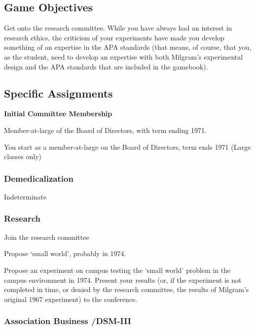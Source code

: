 \begin{refsection}
\section{Game Objectives}
\label{gameobjectives}

Get onto the research committee. While you have always had an interest in research ethics, the criticism of your experiments have made you develop something of an expertise in the APA standards (that means, of course, that you, as the student, need to develop an expertise with both Milgram's experimental design and the APA standards that are included in the gamebook).

\subsection{Specific Assignments}
\label{specificassignments}

\textbf{Initial Committee Membership}

\begin{service}[Milgram]\label{service:milgram}
Member-at-large of the Board of Directors, with term ending 1971.
\end{service}

You start as a member-at-large on the Board of Directors, term ends 1971 (Large classes only)

\subsubsection{Demedicalization}
\label{demedicalization}

Indeterminate

\subsubsection{Research}
\label{research}

Join the research committee

\begin{researchtask}[Milgram]\label{researchtask:milgram}Propose ‘small world’, probably in 1974.
\end{researchtask}Propose an experiment on campus testing the `small world' problem in the campus environment in 1974. Present your results (or, if the experiment is not completed in time, or denied by the research committee, the results of Milgram's original 1967 experiment) to the conference.

\subsubsection{Association Business \slash  DSM-III}
\label{associationbusinessdsm-iii}


\end{refsection}
